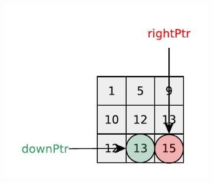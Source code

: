 \begin{figure}
\begin{subfigure}[t]{0.32\textwidth}
		\caption{}
		\label{fig:kth_smallest_in_sorted_matrix:visit6}
	\end{subfigure}
	\hfill
	\begin{subfigure}[t]{0.32\textwidth}
		\includegraphics[width=1\linewidth]{sources/kth_smallest_in_sorted_matrix/images/visit7}
		\caption{}
		\label{fig:kth_smallest_in_sorted_matrix:visit7}
	\end{subfigure}
	
	


\end{figure}
